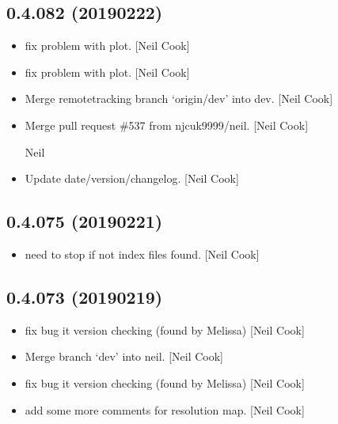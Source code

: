 \documentclass[a4paper,10pt,english]{report}
\begin{document}
\subsection{0.4.082 (2019\sphinxhyphen{}02\sphinxhyphen{}22)}
\label{\detokenize{misc/changelog:id199}}\begin{itemize}
\item {} 
 \sphinxhyphen{} fix problem with  plot. {[}Neil
Cook{]}

\item {} 
 \sphinxhyphen{} fix problem with 
plot. {[}Neil Cook{]}

\item {} 
Merge remote\sphinxhyphen{}tracking branch ‘origin/dev’ into dev. {[}Neil Cook{]}

\item {} 
Merge pull request \#537 from njcuk9999/neil. {[}Neil Cook{]}

Neil

\item {} 
Update date/version/changelog. {[}Neil Cook{]}

\end{itemize}


\subsection{0.4.075 (2019\sphinxhyphen{}02\sphinxhyphen{}21)}
\label{\detokenize{misc/changelog:id200}}\begin{itemize}
\item {} 
 \sphinxhyphen{} need to stop if not index files found. {[}Neil Cook{]}

\end{itemize}


\subsection{0.4.073 (2019\sphinxhyphen{}02\sphinxhyphen{}19)}
\label{\detokenize{misc/changelog:id201}}\begin{itemize}
\item {} 
 \sphinxhyphen{} fix bug it version checking (found by
Melissa) {[}Neil Cook{]}

\item {} 
Merge branch ‘dev’ into neil. {[}Neil Cook{]}

\item {} 
 \sphinxhyphen{} fix bug it version checking (found by
Melissa) {[}Neil Cook{]}

\item {} 
 \sphinxhyphen{} add some more comments for resolution map. {[}Neil Cook{]}

\end{itemize}
\end{document}
